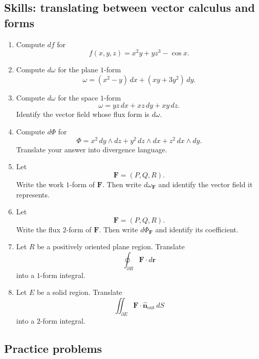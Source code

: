 \subsection{Skills: translating between vector calculus and forms}

\begin{enumerate}
\item Compute \(df\) for
\[
    f(x,y,z)=x^2y+yz^3-\cos x.
\]

\item Compute \(d\omega\) for the plane \(1\)-form
\[
    \omega=(x^2-y)\,dx+(xy+3y^2)\,dy.
\]

\item Compute \(d\omega\) for the space \(1\)-form
\[
    \omega=yz\,dx+xz\,dy+xy\,dz.
\]
Identify the vector field whose flux form is \(d\omega\).

\item Compute \(d\Phi\) for
\[
    \Phi=x^2\,dy\wedge dz+y^2\,dz\wedge dx+z^2\,dx\wedge dy.
\]
Translate your answer into divergence language.

\item Let
\[
    \mathbf F=(P,Q,R).
\]
Write the work \(1\)-form of \(\mathbf F\).  Then write \(d\omega_{\mathbf F}\) and
identify the vector field it represents.

\item Let
\[
    \mathbf F=(P,Q,R).
\]
Write the flux \(2\)-form of \(\mathbf F\).  Then write \(d\Phi_{\mathbf F}\) and identify
its coefficient.

\item Let \(R\) be a positively oriented plane region.  Translate
\[
    \oint_{\partial R}\mathbf F\cdot d\mathbf r
\]
into a \(1\)-form integral.

\item Let \(E\) be a solid region.  Translate
\[
    \iint_{\partial E}\mathbf F\cdot\widehat{\mathbf n}_{\mathrm{out}}\,dS
\]
into a \(2\)-form integral.
\end{enumerate}

\subsection{Practice problems}

